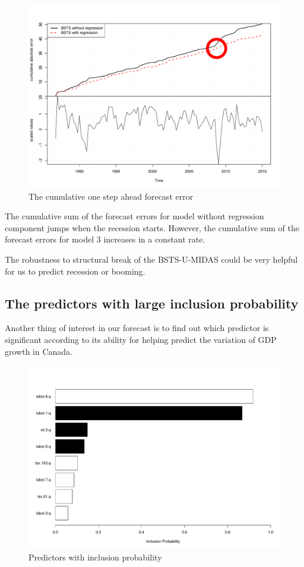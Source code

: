 \begin{figure}
	\centering
	\includegraphics[width=0.6\linewidth]{Figures/cumulative_errors}
	\caption{The cumulative one step ahead forecast error}
	\label{fig:cumulative_errors}
\end{figure}


The cumulative sum of the forecast errors for model without regression component jumps when the recession starts. However, the cumulative sum of the forecast errors for model 3 increases in a constant rate. 

The robustness to structural break of the BSTS-U-MIDAS could be very helpful for us to predict recession or booming. 

\subsection{The predictors with large inclusion probability}

Another thing of interest in our forecast  is to find out which predictor is significant according to its ability for helping predict the variation of GDP growth in Canada.


\begin{figure}[h]
	\centering
	\includegraphics[width=0.7\linewidth]{Figures/Coefficients}
	\caption{Predictors with inclusion probability}
	\label{fig:Coefficients}
\end{figure}


